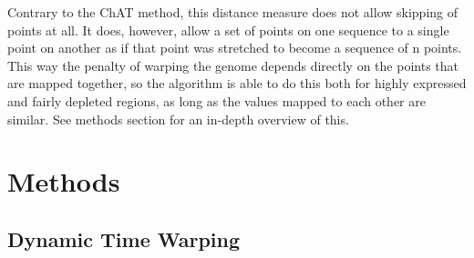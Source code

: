 \documentclass[parskip]{cs4rep}
\begin{document}
Contrary to the ChAT method, this distance measure does not allow skipping of points at all. It does, however, allow a set of points on one sequence to a single point on another as if that point was stretched to become a sequence of n points. This way the penalty of warping the genome depends directly on the points that are mapped together, so the algorithm is able to do this both for highly expressed and fairly depleted regions, as long as the values mapped to each other are similar. See methods section for an in-depth overview of this.


\chapter{Methods}
\section{Dynamic Time Warping}
\end{document}
